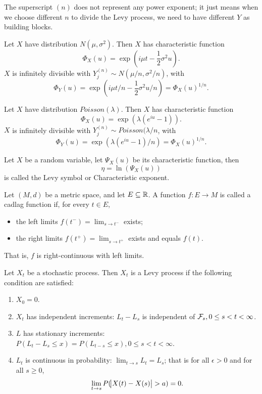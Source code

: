 \begin{refsection}
\begin{remark}
	The superscript $(n)$ does not represent any power exponent; it just means when we choose different $n$ to divide the Levy process, we need to have different $Y$ as building blocks.
\end{remark}

\begin{example}
	Let $X$ have distribution $N(\mu,\sigma^2)$. Then $X$ has characteristic function 
	$$\Phi_X(u) = \exp(i\mu t - \frac{1}{2}\sigma^2u).$$
	$X$ is infinitely divisible with $Y^{(n)}_j\sim N(\mu/n,\sigma^2/n)$, with 
	$$\Phi_Y(u) = \exp(i\mu t/n - \frac{1}{2}\sigma^2u/n) = \Phi_X(u)^{1/n}.$$ 
\end{example}

\begin{example}
	Let $X$ have distribution $Poisson(\lambda)$. Then $X$ has characteristic function 
	$$\Phi_X(u) = \exp(\lambda (e^{iu} - 1)).$$
	$X$ is infinitely divisible with $Y^{(n)}_j\sim Poisson(\lambda/n$, with 
	$$\Phi_Y(u) = \exp(\lambda (e^{iu} - 1)/n) = \Phi_X(u)^{1/n}.$$ 
\end{example}


\begin{definition}
	Let $X$ be a random variable, let $\Psi_X(u)$ be its characteristic function, then 
	$$\eta = \ln(\Psi_X(u))$$
	is called the Levy symbol or Characteristic exponent. 
\end{definition}


\begin{definition}[cadlag]
	Let $(M,d)$ be a metric space, and let $E\subseteq \mathbb{R}$. A function $f: E\to M$ is called a cadlag function if, for every $t\in E$,
	\begin{itemize}
		\item the left limits $f(t^-) = \lim_{s\to t^-}$ exists;
		\item the right limits $f(t^+) = \lim_{s\to t^+}$ exists and equals $f(t)$.
	\end{itemize}
	That is, $f$ is right-continuous with left limits. 
\end{definition}



\begin{definition}
	Let $X_t$ be a stochastic process. Then $X_t$ is a Levy process if the following condition are satisfied:
	\begin{enumerate}
		\item $X_0 = 0$.
		\item $X_t$ has independent increments: $L_t - L_s$ is independent of $\mathcal{F}_s, 0\leq s < t <\infty$.
		\item $L$ has stationary increments: $P(L_t-L_s \leq x) = P(L_{t-s}\leq x), 0 \leq s < t <\infty.$
		\item $L_t$ is continuous in probability: $\lim_{t\to s} L_t = L_s$; that is
		for all $\epsilon > 0$ and for all $s\geq 0$, 
		$$\lim_{t\to s} P(\abs{X(t) - X(s)} > a) = 0.$$ 
	\end{enumerate}
\end{definition}


\end{refsection}
